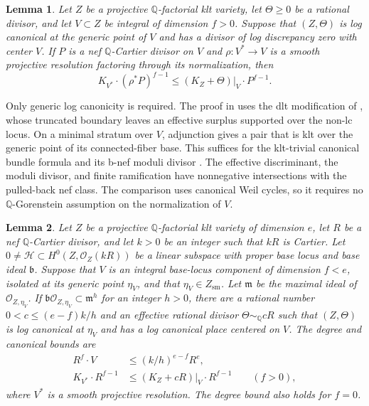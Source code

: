 \documentclass[12pt,a4paper,psamsfonts]{amsart}
\theoremstyle{definition}
\theoremstyle{plain}
\newtheorem{lemma}{Lemma}[section]
\newcommand{\Q}{\mathbb Q}
\newcommand{\OO}{\mathcal O}
\begin{document}
\begin{lemma}
\label{j:subadjunction}
Let $Z$ be a projective $\Q$-factorial klt variety, let
$\Theta\geq0$ be a rational divisor, and let $V\subset Z$ be
integral of dimension $f>0$.  Suppose that $(Z,\Theta)$ is log
canonical at the generic point of $V$ and has a divisor of log
discrepancy zero with center $V$.  If $P$ is a nef $\mathbb{Q}$-Cartier
divisor on $V$ and $\rho:V^*\to V$ is a smooth projective resolution
factoring through its normalization, then
\[
 K_{V^*}\cdot(\rho^*P)^{f-1}
 \leq (K_Z+\Theta)|_V\cdot P^{f-1}.
\]
\end{lemma}

Only generic log canonicity is required.  The proof in \cite{LA}
uses the dlt modification of \cite[Theorem~2.10]{FH}, whose
truncated boundary leaves an effective surplus supported over
the non-lc locus.  On a minimal stratum over $V$, adjunction
gives a pair that is klt over the generic point of its
connected-fiber base.  This suffices for the klt-trivial
canonical bundle formula and its b-nef moduli divisor
\cite[Definition~3.1 and Theorem~3.5]{FG}.  The effective
discriminant, the moduli divisor, and finite ramification have
nonnegative intersections with the pulled-back nef class.
The comparison uses canonical Weil cycles, so it requires no
$\Q$-Gorenstein assumption on the normalization of $V$.

\begin{lemma}
\label{j:base-component}
Let $Z$ be a projective $\Q$-factorial klt variety of dimension
$e$, let $R$ be a nef $\mathbb{Q}$-Cartier divisor, and let $k>0$
be an integer such that $kR$ is Cartier.  Let
$0\ne\mathcal H\subset H^0(Z,\OO_Z(kR))$ be a linear subspace
with proper base locus and base ideal $\mathfrak b$.  Suppose that
$V$ is an integral base-locus component of dimension $f<e$,
isolated at its generic point $\eta_V$, and that
$\eta_V\in Z_{\mathrm{sm}}$.  Let
$\mathfrak m$ be the maximal ideal of $\OO_{Z,\eta_V}$.
If $\mathfrak b\OO_{Z,\eta_V}\subset\mathfrak m^h$ for an
integer $h>0$, there are a rational number $0<c\leq(e-f)k/h$ and an
effective rational divisor $\Theta\sim_{\Q}cR$ such that
$(Z,\Theta)$ is log canonical at $\eta_V$ and has a log canonical
place centered on $V$.  The degree and canonical bounds are
\begin{equation}
\label{j:base-bounds}
 \begin{split}
 R^f\cdot V&\leq(k/h)^{e-f}R^e,\\
 K_{V^*}\cdot R^{f-1}
   &\leq(K_Z+cR)|_V\cdot R^{f-1}\qquad(f>0),
 \end{split}
\end{equation}
where $V^*$ is a smooth projective resolution.  The degree bound
also holds for $f=0$.
\end{lemma}
\end{document}
